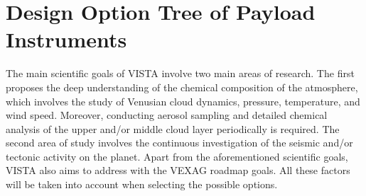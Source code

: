 








\section{Design Option Tree of Payload Instruments}
\label{sec:DOT_payload}

The main scientific goals of VISTA involve two main areas of research. The first proposes the deep understanding of the chemical composition of the atmosphere, which involves the study of Venusian cloud dynamics, pressure, temperature, and wind speed. Moreover, conducting aerosol sampling and detailed chemical analysis of the upper and/or middle cloud layer periodically is required. The second area of study involves the continuous investigation of the seismic and/or tectonic activity on the planet. Apart from the aforementioned scientific goals, VISTA also aims to address with the VEXAG roadmap goals. All these factors will be taken into account when selecting the possible options. 


